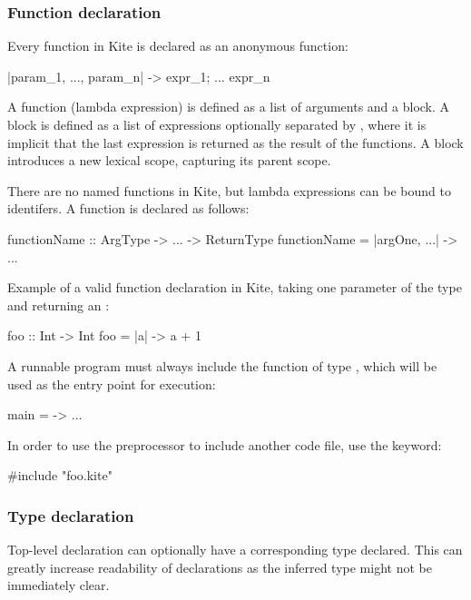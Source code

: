 \subsubsection{Function declaration}
\label{sec:func-decl}
Every function in Kite is declared as an anonymous function:

\begin{kite}
|param_1, ..., param_n| -> {
  expr_1;
  ...
  expr_n
}
\end{kite}

A function (lambda expression) is defined as a list of arguments and a block. A block is defined as a list of expressions optionally separated by \code{;}, where it is implicit that the last expression is returned as the result of the functions. A block introduces a new lexical scope, capturing its parent scope.

There are no named functions in Kite, but lambda expressions can be bound to identifers. A function is declared as follows:

\begin{kite}
functionName :: ArgType -> ... -> ReturnType
functionName = |argOne, ...| -> { ... }
\end{kite}

Example of a valid function declaration in Kite, taking one parameter of the type  and returning an :

\begin{kite}
foo :: Int -> Int
foo = |a| -> {
  a + 1
}
\end{kite}

A runnable program must always include the  function of type , which will be used as the entry point for execution:

\begin{kite}
main = -> { ... }
\end{kite}

In order to use the preprocessor to include another code file, use the  keyword:
\begin{kite}
#include "foo.kite"
\end{kite}

\subsubsection{Type declaration}

Top-level declaration can optionally have a corresponding type declared. This can greatly increase readability of declarations as the inferred type might not be immediately clear.

